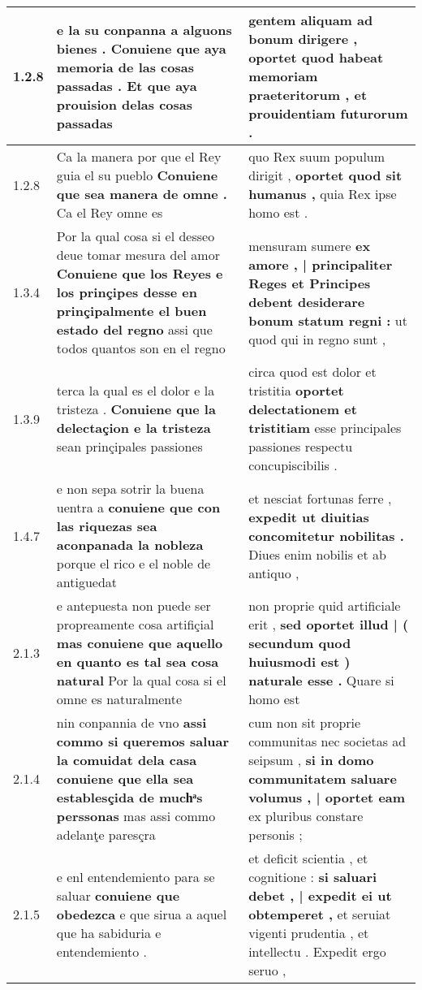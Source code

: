 \begin{tabular}{|p{1cm}|p{6.5cm}|p{6.5cm}|}
1.2.8 & e la su conpanna a alguons bienes . \textbf{ Conuiene que aya memoria de las cosas passadas . } Et que aya prouision delas cosas passadas & gentem aliquam ad bonum dirigere , \textbf{ oportet quod habeat memoriam praeteritorum , } et prouidentiam futurorum . \\\hline
1.2.8 & Ca la manera por que el Rey guia el su pueblo \textbf{ Conuiene que sea manera de omne . } Ca el Rey omne es & quo Rex suum populum dirigit , \textbf{ oportet quod sit humanus , } quia Rex ipse homo est . \\\hline
1.3.4 & Por la qual cosa si el desseo deue tomar mesura del amor \textbf{ Conuiene que los Reyes e los prinçipes desse en prinçipalmente el buen estado del regno } assi que todos quantos son en el regno & mensuram sumere \textbf{ ex amore , | principaliter Reges et Principes debent desiderare bonum statum regni : } ut quod qui in regno sunt , \\\hline
1.3.9 & terca la qual es el dolor e la tristeza . \textbf{ Conuiene que la delectaçion e la tristeza } sean prinçipales passiones & circa quod est dolor et tristitia \textbf{ oportet delectationem et tristitiam } esse principales passiones respectu concupiscibilis . \\\hline
1.4.7 & e non sepa sotrir la buena uentra a \textbf{ conuiene que con las riquezas sea aconpanada la nobleza } porque el rico e el noble de antiguedat & et nesciat fortunas ferre , \textbf{ expedit ut diuitias concomitetur nobilitas . } Diues enim nobilis et ab antiquo , \\\hline
2.1.3 & e antepuesta non puede ser propreamente cosa artifiçial \textbf{ mas conuiene que aquello en quanto es tal sea cosa natural } Por la qual cosa si el omne es naturalmente & non proprie quid artificiale erit , \textbf{ sed oportet illud | ( secundum quod huiusmodi est ) naturale esse . } Quare si homo est \\\hline
2.1.4 & nin conpannia de vno \textbf{ assi commo si queremos saluar la comuidat dela casa conuiene que ella sea establesçida de muchͣs perssonas } mas assi commo adelanţe paresçra & cum non sit proprie communitas nec societas ad seipsum , \textbf{ si in domo communitatem saluare volumus , | oportet eam } ex pluribus constare personis ; \\\hline
2.1.5 & e enl entendemiento para se saluar \textbf{ conuiene que obedezca } e que sirua a aquel que ha sabiduria e entendemiento . & et deficit scientia , et cognitione : \textbf{ si saluari debet , | expedit ei ut obtemperet , } et seruiat vigenti prudentia , et intellectu . Expedit ergo seruo , \\\hline

\end{tabular}
